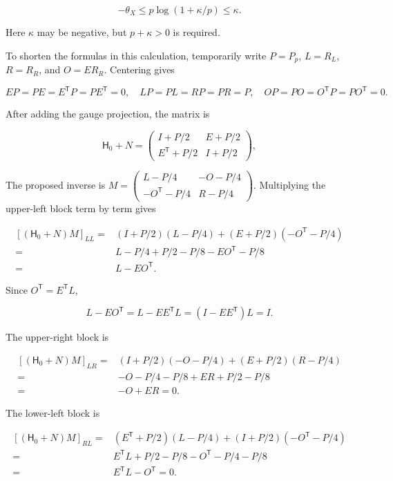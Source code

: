 \documentclass[11pt,a4paper]{article}
\begin{document}
\[
-\theta_X\le p\log(1+\kappa/p)\le\kappa.
\]

Here \(\kappa\) may be negative, but \(p+\kappa>0\) is required.

To shorten the formulas in this calculation, temporarily write \(P=P_p\), \(L=R_L\), \(R=R_R\), and \(O=ER_R\). Centering gives

\[
EP=PE=E^{\mathsf T}P=PE^{\mathsf T}=0,\quad
LP=PL=RP=PR=P,\quad OP=PO=O^{\mathsf T}P=PO^{\mathsf T}=0.
\]

After adding the gauge projection, the matrix is

\[
\mathsf H_0+N=\begin{pmatrix}I+P/2&E+P/2\\E^{\mathsf T}+P/2&I+P/2\end{pmatrix},
\]

The proposed inverse is \(M=\left(\begin{smallmatrix}L-P/4&-O-P/4\\-O^{\mathsf T}-P/4&R-P/4\end{smallmatrix}\right)\). Multiplying the upper-left block term by term gives

\[
\begin{aligned}
[(\mathsf H_0+N)M]_{LL}
={}&(I+P/2)(L-P/4)+(E+P/2)(-O^{\mathsf T}-P/4)\\
={}&L-P/4+P/2-P/8-EO^{\mathsf T}-P/8\\
={}&L-EO^{\mathsf T}.
\end{aligned}
\]

Since \(O^{\mathsf T}=E^{\mathsf T}L\),

\[
L-EO^{\mathsf T}=L-EE^{\mathsf T}L=(I-EE^{\mathsf T})L=I.
\]

The upper-right block is

\[
\begin{aligned}
[(\mathsf H_0+N)M]_{LR}
={}&(I+P/2)(-O-P/4)+(E+P/2)(R-P/4)\\
={}&-O-P/4-P/8+ER+P/2-P/8\\
={}&-O+ER=0.
\end{aligned}
\]

The lower-left block is

\[
\begin{aligned}
[(\mathsf H_0+N)M]_{RL}
={}&(E^{\mathsf T}+P/2)(L-P/4)+(I+P/2)(-O^{\mathsf T}-P/4)\\
={}&E^{\mathsf T}L+P/2-P/8-O^{\mathsf T}-P/4-P/8\\
={}&E^{\mathsf T}L-O^{\mathsf T}=0.
\end{aligned}
\]
\end{document}
